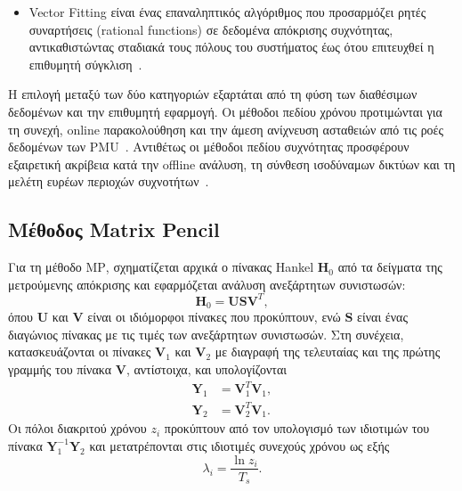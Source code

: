 \begin{itemize}
    \begin{itemize}
        \item Vector Fitting είναι ένας επαναληπτικός αλγόριθμος που προσαρμόζει ρητές συναρτήσεις (rational functions) σε δεδομένα απόκρισης συχνότητας, αντικαθιστώντας σταδιακά τους πόλους του συστήματος έως ότου επιτευχθεί η επιθυμητή σύγκλιση~\cite{gustavsen1999vectorfitting}.
    \end{itemize}
\end{itemize}

Η επιλογή μεταξύ των δύο κατηγοριών εξαρτάται από τη φύση των διαθέσιμων δεδομένων και την επιθυμητή εφαρμογή. Οι μέθοδοι πεδίου χρόνου προτιμώνται για τη συνεχή, online παρακολούθηση και την άμεση ανίχνευση ασταθειών από τις ροές δεδομένων των PMU~\cite{sfetkos2024measurement,schumacher2022clusteredr3ls}. Αντιθέτως οι μέθοδοι πεδίου συχνότητας προσφέρουν εξαιρετική ακρίβεια κατά την offline ανάλυση, τη σύνθεση ισοδύναμων δικτύων και τη μελέτη ευρέων περιοχών συχνοτήτων~\cite{modal2018,gustavsen1999vectorfitting}.

\subsection{Μέθοδος Matrix Pencil}
Για τη μέθοδο \textenglish{MP}, σχηματίζεται αρχικά ο πίνακας Hankel $\mathbf{H}_0$ από τα δείγματα της μετρούμενης απόκρισης και εφαρμόζεται ανάλυση ανεξάρτητων συνιστωσών:
\begin{equation}
\mathbf{H}_0=\mathbf{U}\mathbf{S}\mathbf{V}^{T},
\label{eq:mp-decomposition}
\end{equation}
όπου $\mathbf{U}$ και $\mathbf{V}$ είναι οι ιδιόμορφοι πίνακες που προκύπτουν, ενώ $\mathbf{S}$ είναι ένας διαγώνιος πίνακας με τις τιμές των ανεξάρτητων συνιστωσών. Στη συνέχεια, κατασκευάζονται οι πίνακες $\mathbf{V}_1$ και $\mathbf{V}_2$ με διαγραφή της τελευταίας και της πρώτης γραμμής του πίνακα $\mathbf{V}$, αντίστοιχα, και υπολογίζονται
\begin{equation}
\begin{aligned}
\mathbf{Y}_1&=\mathbf{V}_1^{T}\mathbf{V}_1,\\
\mathbf{Y}_2&=\mathbf{V}_2^{T}\mathbf{V}_1.
\end{aligned}
\label{eq:mp-y-matrices}
\end{equation}
Οι πόλοι διακριτού χρόνου $z_i$ προκύπτουν από τον υπολογισμό των ιδιοτιμών του πίνακα $\mathbf{Y}_1^{-1}\mathbf{Y}_2$ και μετατρέπονται στις ιδιοτιμές συνεχούς χρόνου ως εξής~\cite{modal2018,hua1990matrix}
\begin{equation}
\lambda_i=\frac{\ln z_i}{T_s}.
\label{eq:mp-continuous-eigenvalue}
\end{equation}

